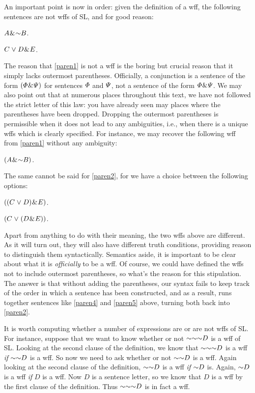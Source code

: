 An important point is now in order: given the definition of a wff, the following sentences are not wffs of SL, and for good reason:
\begin{earg}
  \item[\ex{paren1}] $A \eand \enot B$.
  \item[\ex{paren2}] $C \mkern1mu\vee\mkern1mu D \mkern1mu\&\mkern1mu E$.
\end{earg}
The reason that \ref{paren1} is not a wff is the boring but crucial reason that it simply lacks outermost parentheses.
Officially, a conjunction is a sentence of the form $(\varPhi{} \mkern1mu\&\mkern1mu \varPsi{})$ for sentences $\varPhi{}$ and $\varPsi{}$, not a sentence of the form $\varPhi{} \mkern1mu\&\mkern1mu \varPsi{}$.
We may also point out that at numerous places throughout this text, we have not followed the strict letter of this law: you have already seen may places where the parentheses have been dropped.
Dropping the outermost parentheses is permissible when it does not lead to any ambiguities, i.e., when there is a unique wffs which is clearly specified.
For instance, we may recover the following wff from \ref{paren1} without any ambiguity:
\begin{earg}
  \item[\ex{paren3}] $(A \eand \enot B)$.
\end{earg}
The same cannot be said for \ref{paren2}, for we have a choice between the following options:
\begin{earg}
  \item[\ex{paren4}] $((C \mkern1mu\vee\mkern1mu D) \mkern1mu\&\mkern1mu E)$.
  \item[\ex{paren5}] $(C \mkern1mu\vee\mkern1mu (D \mkern1mu\&\mkern1mu E))$.
\end{earg}
Apart from anything to do with their meaning, the two wffs above are different.
As it will turn out, they will also have different truth conditions, providing reason to distinguish them syntactically.
Semantics aside, it is important to be clear about what it is \textit{officially} to be a wff.
Of course, we could have defined the wffs not to include outermost parentheses, so what's the reason for this stipulation.
The answer is that without adding the parentheses, our syntax fails to keep track of the order in which a sentence has been constructed, and as a result, runs together sentences like \ref{paren4} and \ref{paren5} above, turning both back into \ref{paren2}.

It is worth computing whether a number of expressions are or are not wffs of SL.
For instance, suppose that we want to know whether or not $\enot \enot \enot D$ is a wff of SL.
Looking at the second clause of the definition, we know that $\enot \enot \enot D$ is a wff \emph{if} $\enot \enot D$ is a wff.
So now we need to ask whether or not $\enot \enot D$ is a wff.
Again looking at the second clause of the definition, $\enot \enot D$ is a wff \emph{if} $\enot D$ is.
Again, $\enot D$ is a wff \emph{if} $D$ is a wff.
Now $D$ is a sentence letter, so we know that $D$ is a wff by the first clause of the definition.
Thus $\enot \enot \enot D$ is in fact a wff. 

